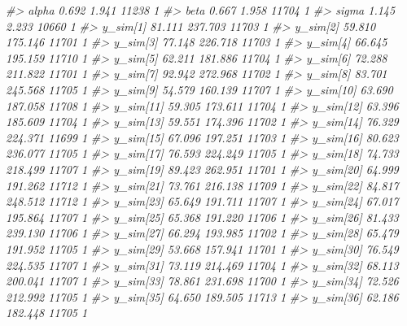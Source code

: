 \documentclass[
  10pt,
  italian,
  a4paper,
  extrafontsizes,onecolumn,openright
  ]{memoir}
\newenvironment{Shaded}{\begin{snugshade}}{\end{snugshade}}
\newcommand{\CommentTok}[1]{\textcolor[rgb]{0.56,0.35,0.01}{\textit{#1}}}
\begin{document}
\begin{Shaded}
\begin{Highlighting}[]
\CommentTok{\#\textgreater{} alpha       0.692   1.941 11238    1}
\CommentTok{\#\textgreater{} beta        0.667   1.958 11704    1}
\CommentTok{\#\textgreater{} sigma       1.145   2.233 10660    1}
\CommentTok{\#\textgreater{} y\_sim[1]   81.111 237.703 11703    1}
\CommentTok{\#\textgreater{} y\_sim[2]   59.810 175.146 11701    1}
\CommentTok{\#\textgreater{} y\_sim[3]   77.148 226.718 11703    1}
\CommentTok{\#\textgreater{} y\_sim[4]   66.645 195.159 11710    1}
\CommentTok{\#\textgreater{} y\_sim[5]   62.211 181.886 11704    1}
\CommentTok{\#\textgreater{} y\_sim[6]   72.288 211.822 11701    1}
\CommentTok{\#\textgreater{} y\_sim[7]   92.942 272.968 11702    1}
\CommentTok{\#\textgreater{} y\_sim[8]   83.701 245.568 11705    1}
\CommentTok{\#\textgreater{} y\_sim[9]   54.579 160.139 11707    1}
\CommentTok{\#\textgreater{} y\_sim[10]  63.690 187.058 11708    1}
\CommentTok{\#\textgreater{} y\_sim[11]  59.305 173.611 11704    1}
\CommentTok{\#\textgreater{} y\_sim[12]  63.396 185.609 11704    1}
\CommentTok{\#\textgreater{} y\_sim[13]  59.551 174.396 11702    1}
\CommentTok{\#\textgreater{} y\_sim[14]  76.329 224.371 11699    1}
\CommentTok{\#\textgreater{} y\_sim[15]  67.096 197.251 11703    1}
\CommentTok{\#\textgreater{} y\_sim[16]  80.623 236.077 11705    1}
\CommentTok{\#\textgreater{} y\_sim[17]  76.593 224.249 11705    1}
\CommentTok{\#\textgreater{} y\_sim[18]  74.733 218.499 11707    1}
\CommentTok{\#\textgreater{} y\_sim[19]  89.423 262.951 11701    1}
\CommentTok{\#\textgreater{} y\_sim[20]  64.999 191.262 11712    1}
\CommentTok{\#\textgreater{} y\_sim[21]  73.761 216.138 11709    1}
\CommentTok{\#\textgreater{} y\_sim[22]  84.817 248.512 11712    1}
\CommentTok{\#\textgreater{} y\_sim[23]  65.649 191.711 11707    1}
\CommentTok{\#\textgreater{} y\_sim[24]  67.017 195.864 11707    1}
\CommentTok{\#\textgreater{} y\_sim[25]  65.368 191.220 11706    1}
\CommentTok{\#\textgreater{} y\_sim[26]  81.433 239.130 11706    1}
\CommentTok{\#\textgreater{} y\_sim[27]  66.294 193.985 11702    1}
\CommentTok{\#\textgreater{} y\_sim[28]  65.479 191.952 11705    1}
\CommentTok{\#\textgreater{} y\_sim[29]  53.668 157.941 11701    1}
\CommentTok{\#\textgreater{} y\_sim[30]  76.549 224.535 11707    1}
\CommentTok{\#\textgreater{} y\_sim[31]  73.119 214.469 11704    1}
\CommentTok{\#\textgreater{} y\_sim[32]  68.113 200.041 11707    1}
\CommentTok{\#\textgreater{} y\_sim[33]  78.861 231.698 11700    1}
\CommentTok{\#\textgreater{} y\_sim[34]  72.526 212.992 11705    1}
\CommentTok{\#\textgreater{} y\_sim[35]  64.650 189.505 11713    1}
\CommentTok{\#\textgreater{} y\_sim[36]  62.186 182.448 11705    1}

\end{Highlighting}
\end{Shaded}
\end{document}
